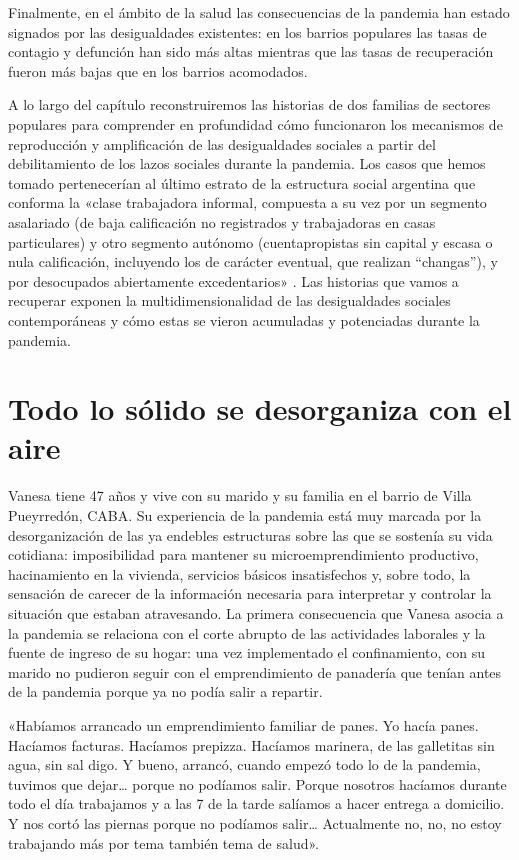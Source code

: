 \begin{refsection}
Finalmente, en el ámbito de la salud las consecuencias de la pandemia han estado signados por las desigualdades existentes: en los barrios populares las tasas de contagio y defunción han sido más altas mientras que las tasas de recuperación fueron más bajas que en los barrios acomodados.

A lo largo del capítulo reconstruiremos las historias de dos familias de sectores populares para comprender en profundidad cómo funcionaron los mecanismos de reproducción y amplificación de las desigualdades sociales a partir del debilitamiento de los lazos sociales durante la pandemia. Los casos que hemos tomado pertenecerían al último estrato de la estructura social argentina que conforma la «clase trabajadora informal, compuesta a su vez por un segmento asalariado (de baja calificación no registrados y trabajadoras en casas particulares) y otro segmento autónomo (cuentapropistas sin capital y escasa o nula calificación, incluyendo los de carácter eventual, que realizan “changas”), y por desocupados abiertamente excedentarios» \protect\parencite[pág.~7]{4252-BENZA2022}. Las historias que vamos a recuperar exponen la multidimensionalidad de las desigualdades sociales contemporáneas y cómo estas se vieron acumuladas y potenciadas durante la pandemia.


\section[Todo lo sólido se desorganiza con el aire]{Todo lo sólido se desorganiza con el aire}
\label{cap-25.todo-lo-solido-se-desorganiza-con-el-aire}
Vanesa tiene 47 años y vive con su marido y su familia en el barrio de Villa Pueyrredón, CABA. Su experiencia de la pandemia está muy marcada por la desorganización de las ya endebles estructuras sobre las que se sostenía su vida cotidiana: imposibilidad para mantener su microemprendimiento productivo, hacinamiento en la vivienda, servicios básicos insatisfechos y, sobre todo, la sensación de carecer de la información necesaria para interpretar y controlar la situación que estaban atravesando. La primera consecuencia que Vanesa asocia a la pandemia se relaciona con el corte abrupto de las actividades laborales y la fuente de ingreso de su hogar: una vez implementado el confinamiento, con su marido no pudieron seguir con el emprendimiento de panadería que tenían antes de la pandemia porque ya no podía salir a repartir.


\begin{gbcita}
«Habíamos arrancado un emprendimiento familiar de panes. Yo hacía panes. Hacíamos facturas. Hacíamos prepizza. Hacíamos marinera, de las galletitas sin agua, sin sal digo. Y bueno, arrancó, cuando empezó todo lo de la pandemia, tuvimos que dejar… porque no podíamos salir. Porque nosotros hacíamos durante todo el día trabajamos y a las 7 de la tarde salíamos a hacer entrega a domicilio. Y nos cortó las piernas porque no podíamos salir… Actualmente no, no, no estoy trabajando más por tema también tema de salud».


\end{gbcita}
\end{refsection}
